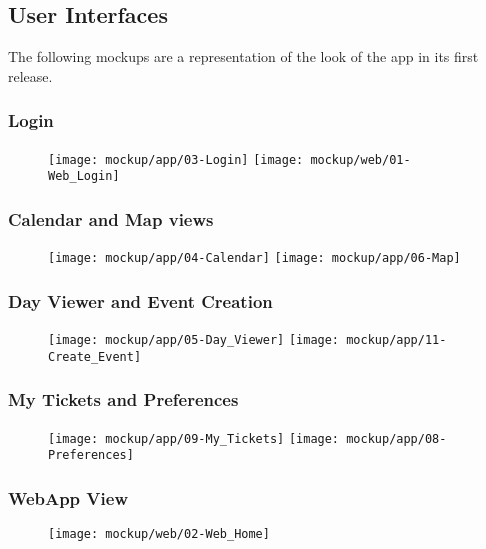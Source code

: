 \subsection{User Interfaces}
\label{subsect:User Interfaces}
	The following mockups are a representation of the look of the app in its first release.
	\subsubsection{Login}
	\begin{figure}[H]
	\texttt{[image: mockup/app/03-Login]}
	\vspace{2.5cm}
	\texttt{[image: mockup/web/01-Web\_Login]}
	\centering 
	\end{figure}
	
	\subsubsection{Calendar and Map views}
	\begin{figure}[H]
	\texttt{[image: mockup/app/04-Calendar]}
	\hspace{2.5cm}
	\texttt{[image: mockup/app/06-Map]}
	\centering 
	\end{figure}
	
	\subsubsection{Day Viewer and Event Creation}
	\begin{figure}[H]
	\texttt{[image: mockup/app/05-Day\_Viewer]}
	\hspace{2.5cm}
	\texttt{[image: mockup/app/11-Create\_Event]}
	\centering 
	\end{figure}
	
	\subsubsection{My Tickets and Preferences}
	\begin{figure}[H]
	\texttt{[image: mockup/app/09-My\_Tickets]}
	\hspace{2.5cm}
	\texttt{[image: mockup/app/08-Preferences]}
	\centering 
	\end{figure}
	
	\subsubsection{WebApp View}
	\begin{figure}[H]
	\texttt{[image: mockup/web/02-Web\_Home]}
	\centering 
	\end{figure}
